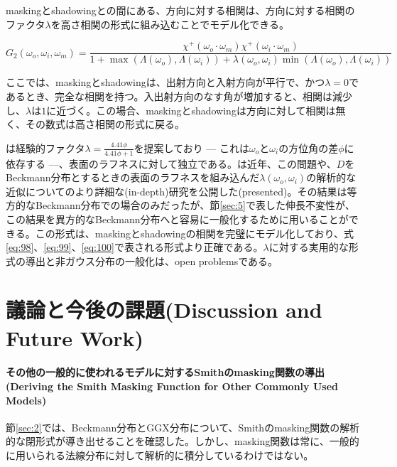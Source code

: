 \documentclass[a4j,xelatex,ja=standard]{bxjsarticle}
\begin{document}
maskingとshadowingとの間にある、方向に対する相関は、方向に対する相関のファクタ$\lambda$を高さ相関の形式に組み込むことでモデル化できる。

\begin{equation}
    G_2(\omega_o, \omega_i, \omega_m) = \frac{\chi^+(\omega_o \cdot \omega_m) \chi^+(\omega_i \cdot \omega_m)}{1 + \max(\Lambda(\omega_o), \Lambda(\omega_i)) + \lambda(\omega_o, \omega_i) \min(\Lambda(\omega_o), \Lambda(\omega_i))}
    \label{eq:101}
\end{equation}

ここでは、maskingとshadowingは、出射方向と入射方向が平行で、かつ$\lambda = 0$であるとき、完全な相関を持つ。入出射方向のなす角が増加すると、相関は減少し、$\lambda$は$1$に近づく。この場合、maskingとshadowingは方向に対して相関は無く、その数式は高さ相関の形式に戻る。

\citeauthor{Ginneken1998} \cite{Ginneken1998}は経験的ファクタ$\lambda = \frac{4.41\phi}{4.41\phi + 1}$を提案しており --- これは$\omega_o$と$\omega_i$の方位角の差$\phi$に依存する ---、表面のラフネスに対して独立である。\citeauthor{Heitz2013}は近年、この問題や、$D$をBeckmann分布とするときの表面のラフネスを組み込んだ$\lambda(\omega_o, \omega_i)$の解析的な近似についてのより詳細な(in-depth)研究を公開した(presented)\cite{Heitz2013}。その結果は等方的なBeckmann分布での場合のみだったが、節\ref{sec:5}で表した伸長不変性が、この結果を異方的なBeckmann分布へと容易に一般化するために用いることができる。この形式は、maskingとshadowingの相関を完璧にモデル化しており、式\eqref{eq:98}、\eqref{eq:99}、\eqref{eq:100}で表される形式より正確である。$\lambda$に対する実用的な形式の導出と非ガウス分布の一般化は、open problemsである。

\section{議論と今後の課題(Discussion and Future Work)}

\paragraph{その他の一般的に使われるモデルに対するSmithのmasking関数の導出(Deriving the Smith Masking Function for Other Commonly Used Models)}

節\ref{sec:2}では、Beckmann分布とGGX分布について、Smithのmasking関数の解析的な閉形式が導き出せることを確認した。しかし、masking関数は常に、一般的に用いられる法線分布に対して解析的に積分しているわけではない。
\end{document}
